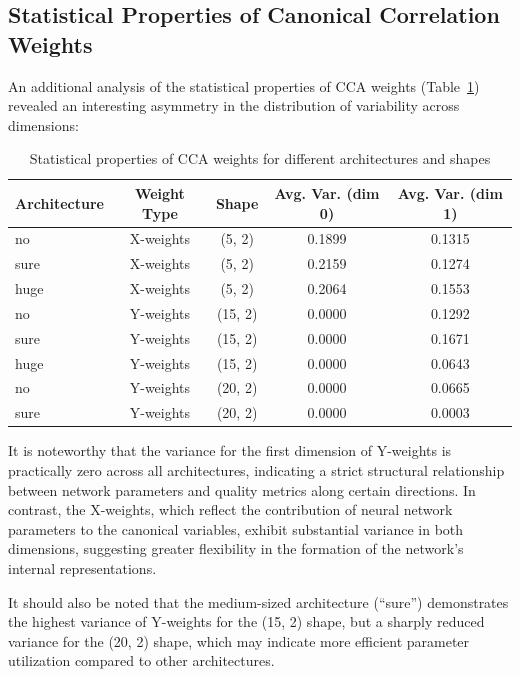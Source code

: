 \documentclass[a4paper,12pt]{article}
\begin{document}
\subsection{Statistical Properties of Canonical Correlation Weights}

An additional analysis of the statistical properties of CCA weights (Table~\ref{tab:cca_stats}) revealed an
interesting asymmetry in the distribution of variability across dimensions:

\begin{table}[ht]
  \centering
  \begin{tabular}{|l|c|c|c|c|}
    \hline
    \textbf{Architecture} & \textbf{Weight Type} & \textbf{Shape} & \textbf{Avg. Var. (dim 0)} &
    \textbf{Avg. Var. (dim 1)} \\
    \hline
    no & X-weights & (5, 2) & 0.1899 & 0.1315 \\
    sure & X-weights & (5, 2) & 0.2159 & 0.1274 \\
    huge & X-weights & (5, 2) & 0.2064 & 0.1553 \\
    \hline
    no & Y-weights & (15, 2) & 0.0000 & 0.1292 \\
    sure & Y-weights & (15, 2) & 0.0000 & 0.1671 \\
    huge & Y-weights & (15, 2) & 0.0000 & 0.0643 \\
    \hline
    no & Y-weights & (20, 2) & 0.0000 & 0.0665 \\
    sure & Y-weights & (20, 2) & 0.0000 & 0.0003 \\
    \hline
  \end{tabular}
  \caption{Statistical properties of CCA weights for different architectures and shapes}
  \label{tab:cca_stats}
\end{table}

It is noteworthy that the variance for the first dimension of Y-weights is practically zero across all
architectures, indicating a strict structural relationship between network parameters and quality metrics
along certain directions. In contrast, the X-weights, which reflect the contribution of neural network
parameters to the canonical variables, exhibit substantial variance in both dimensions, suggesting greater
flexibility in the formation of the network's internal representations.

It should also be noted that the medium-sized architecture (``sure'') demonstrates the highest variance of
Y-weights for the (15, 2) shape, but a sharply reduced variance for the (20, 2) shape, which may indicate
more efficient parameter utilization compared to other architectures.
\end{document}
